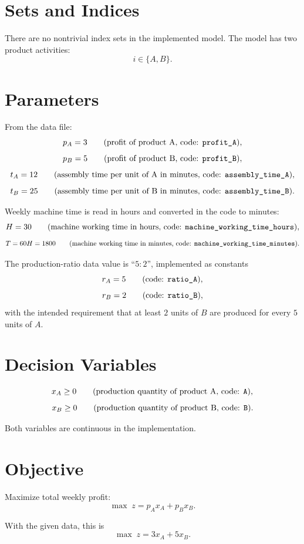 \section*{Sets and Indices}

There are no nontrivial index sets in the implemented model. The model has two product activities:
\[
i \in \{A,B\}.
\]

\section*{Parameters}

From the data file:
\[
p_A = 3
\qquad\text{(profit of product A, code: \texttt{profit\_A})},
\]
\[
p_B = 5
\qquad\text{(profit of product B, code: \texttt{profit\_B})},
\]
\[
t_A = 12
\qquad\text{(assembly time per unit of A in minutes, code: \texttt{assembly\_time\_A})},
\]
\[
t_B = 25
\qquad\text{(assembly time per unit of B in minutes, code: \texttt{assembly\_time\_B})}.
\]

Weekly machine time is read in hours and converted in the code to minutes:
\[
H = 30
\qquad\text{(machine working time in hours, code: \texttt{machine\_working\_time\_hours})},
\]
\[
T = 60H = 1800
\qquad\text{(machine working time in minutes, code: \texttt{machine\_working\_time\_minutes})}.
\]

The production-ratio data value is ``\(5:2\)'', implemented as constants
\[
r_A = 5
\qquad\text{(code: \texttt{ratio\_A})},
\]
\[
r_B = 2
\qquad\text{(code: \texttt{ratio\_B})},
\]
with the intended requirement that at least \(2\) units of \(B\) are produced for every \(5\) units of \(A\).

\section*{Decision Variables}

\[
x_A \ge 0
\qquad\text{(production quantity of product A, code: \texttt{A})},
\]
\[
x_B \ge 0
\qquad\text{(production quantity of product B, code: \texttt{B})}.
\]

Both variables are continuous in the implementation.

\section*{Objective}

Maximize total weekly profit:
\[
\max \; z = p_A x_A + p_B x_B.
\]

With the given data, this is
\[
\max \; z = 3x_A + 5x_B.
\]

